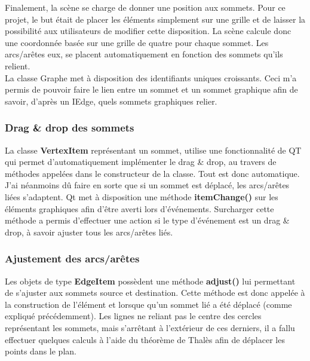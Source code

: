 \documentclass[french]{article}
\begin{document}
				Finalement, la scène se charge de donner une position aux sommets. Pour ce projet, le but était de placer les éléments simplement sur une grille et de laisser la possibilité aux utilisateurs de modifier cette disposition. La scène calcule donc une coordonnée basée sur une grille de quatre pour chaque sommet. Les arcs/arêtes eux, se placent automatiquement en fonction des sommets qu'ils relient. \\
				La classe Graphe met à disposition des identifiants uniques croissants. Ceci m'a permis de pouvoir faire le lien entre un sommet et un sommet graphique afin de savoir, d'après un IEdge, quels sommets graphiques relier.
		
			\subsubsection{Drag \& drop des sommets}
				La classe \textbf{VertexItem} représentant un sommet, utilise une fonctionnalité de QT qui permet d'automatiquement implémenter le drag \& drop, au travers de méthodes appelées dans le constructeur de la classe. Tout est donc automatique. \\
				J'ai néanmoins dû faire en sorte que si un sommet est déplacé, les arcs/arêtes liées s'adaptent. Qt met à disposition une méthode \textbf{itemChange()} sur les éléments graphiques afin d'être averti lors d'événements. Surcharger cette méthode a permis d'effectuer une action si le type d'événement est un drag \& drop, à savoir ajuster tous les arcs/arêtes liés.
				
			\subsubsection{Ajustement des arcs/arêtes}
				Les objets de type \textbf{EdgeItem} possèdent une méthode \textbf{adjust()} lui permettant de s'ajuster aux sommets source et destination. Cette méthode est donc appelée à la construction de l'élément et lorsque qu'un sommet lié a été déplacé (comme expliqué précédemment). Les lignes ne reliant pas le centre des cercles représentant les sommets, mais s'arrêtant à l'extérieur de ces derniers, il a fallu effectuer quelques calculs à l'aide du théorème de Thalès afin de déplacer les points dans le plan.
				
\end{document}
